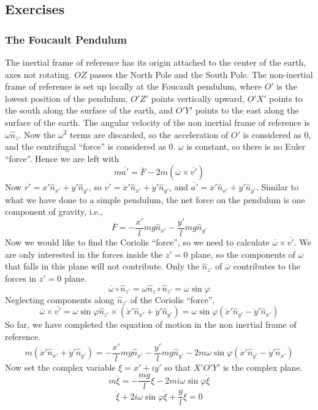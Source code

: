\documentclass[a4paper,12pt,titlepage]{article}
\begin{document}
\subsection{Exercises}
\subsubsection{The Foucault Pendulum}
The inertial frame of reference has its origin attached to the center of the earth, axes not rotating. $OZ$ passes the North Pole and the South Pole. The non-inertial frame of reference is set up locally at the Foucault pendulum, where $O'$ is the lowest position of the pendulum, $O'Z'$ points vertically upward, $O'X'$ points to the south along the surface of the earth, and $O'Y'$ points to the east along the surface of the earth. The angular velocity of the non inertial frame of reference is $\omega \hat n_{z}$. Now the $\omega^2$ terms are discarded, so the acceleration of $O'$ is considered as $0$, and the centrifugal ``force'' is considered as $0$. $\omega$ is constant, so there is no Euler ``force''. Hence we are left with
\[m\overline{a'}=\overline F-2m(\overline\omega\times\overline{v'})\]
Now $\overline{r'}=x'\hat n_{x'}+y'\hat n_{y'}$, so $\overline{v'}=\dot x'\hat n_{x'}+\dot y'\hat n_{y'}$, and $\overline{a'}=\ddot x'\hat n_{x'}+\ddot y'\hat n_{y'}$. Similar to what we have done to a simple pendulum, the net force on the pendulum is one component of gravity, i.e., \[\overline F=-\frac{x'}{l}mg\hat n_{x'}-\frac{y'}{l}mg\hat n_{y'}\]
Now we would like to find the Coriolis ``force'', so we need to calculate $\overline\omega\times\overline{v'}$. We are only interested in the forces inside the $z'=0$ plane, so the components of $\omega$ that falls in this plane will not contribute. Only the $\hat n_{z'}$ of $\overline\omega$ contributes to the forces in $z'=0$ plane. \[\overline\omega\circ\hat n_{z'}=\omega\hat n_z\circ\hat n_{z'}=\omega\sin\varphi\]
Neglecting components along $\hat n_{z'}$ of the Coriolis ``force'',
\[\overline\omega\times\overline{v'}=\omega\sin\varphi\hat n_{z'}\times(\dot x'\hat n_{x'}+\dot y'\hat n_{y'})=\omega\sin\varphi(\dot x'\hat n_{y'}-\dot y'\hat n_{x'})\]
So far, we have completed the equation of motion in the non inertial frame of reference.
\[m(\ddot x'\hat n_{x'}+\ddot y'\hat n_{y'})=-\frac{x'}{l}mg\hat n_{x'}-\frac{y'}{l}mg\hat n_{y'}-2m\omega\sin\varphi(\dot x'\hat n_{y'}-\dot y'\hat n_{x'})\]
Now set the complex variable $\xi=x'+iy'$ so that $X'O'Y'$ is the complex plane.
\[m\ddot\xi=-\frac{mg}{l}\xi-2mi\omega\sin\varphi\dot\xi\]
\[\ddot\xi+2i\omega\sin\varphi\dot\xi+\frac{g}{l}\xi=0\]
\end{document}
